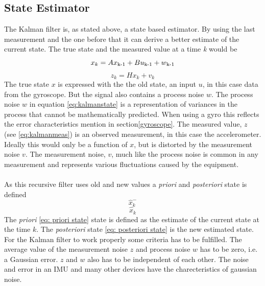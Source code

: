\documentclass[a4paper,11pt]{kth-mag}
\begin{document}
\subsection{State Estimator}
The Kalman filter is, as stated above, a state based estimator. By using the last measurement and the one before that it can derive a better estimate of the current state. The true state and the measured value at a time \textit{k} would be
\begin{equation}\label{eq:kalmanstate}
x_k = Ax\textsubscript{k-1}+Bu\textsubscript{k-1}+w\textsubscript{k-1}
\end{equation}
\begin{equation} \label{eq:kalmanmeas}
z_k = Hx_k + v_k
\end{equation}
The true state $x$ is expressed with the the old state, an input $u$, in this case data from the gyroscope. But the signal also contains a process noise $w$. The process noise $w$ in equation \eqref{eq:kalmanstate} is a representation of variances in the process that cannot be mathematically predicted. When using a gyro this reflects the error characteristics mention in section\ref{gyroscope}. 
The measured value, $z$ (see \eqref{eq:kalmanmeas}) is an observed measurement, in this case the accelerometer. Ideally this would only be a function of $x$, but is distorted by the measurement noise $v$.
The measurement noise, $v$, much like the process noise is common in any measurement and represents various fluctuations caused by the equipment.
\\ \\
As this recursive filter uses old and new values a \textit{priori} and \textit{posteriori} state is defined
\begin{equation} \label{eq: priori state}
\hat{x}^-_k
\end{equation}
\begin{equation} \label{eq: posteriori state}
\hat{x}_k
\end{equation}
The \textit{priori} \eqref{eq: priori state} state is defined as the estimate of the current state at the time $k$. The \textit{posteriori} state \eqref{eq: posteriori state} is the new estimated state.
For the Kalman filter to work properly some criteria has to be fulfilled. The average value of the measurement noise $z$ and process noise $w$ has to be zero, i.e. a Gaussian error. $z$ and $w$ also has to be independent of  each other. The noise and error in an IMU and many other devices have the charecteristics of gaussian noise.
\end{document}
